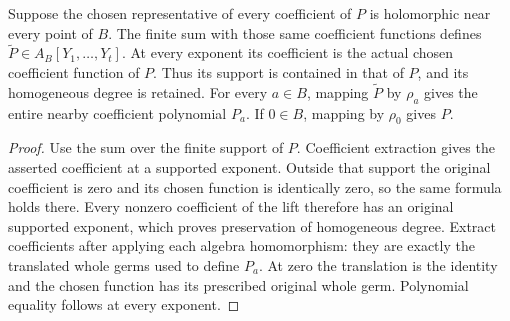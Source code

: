 \begin{lemma}
\label{hir:relative-normal-coefficient-function-polynomial-lift}
\leanok
{}
Suppose the chosen representative of every coefficient of $P$ is holomorphic
near every point of $B$. The finite sum with those same coefficient functions
defines $\widetilde P\in A_B[Y_1,\ldots,Y_t]$. At every exponent its
coefficient is the actual chosen coefficient function of $P$. Thus its support
is contained in that of $P$, and its homogeneous degree is retained. For every
$a\in B$, mapping $\widetilde P$ by $\rho_a$ gives the entire nearby
coefficient polynomial $P_a$. If $0\in B$, mapping by $\rho_0$ gives $P$.
\end{lemma}
\begin{proof}
Use the sum over the finite support of $P$. Coefficient extraction gives the
asserted coefficient at a supported exponent. Outside that support the original
coefficient is zero and its chosen function is identically zero, so the same
formula holds there. Every nonzero coefficient of the lift therefore has an
original supported exponent, which proves preservation of homogeneous degree.
Extract coefficients after applying each algebra homomorphism: they are exactly
the translated whole germs used to define $P_a$. At zero the translation is the
identity and the chosen function has its prescribed original whole germ.
Polynomial equality follows at every exponent.
\end{proof}

